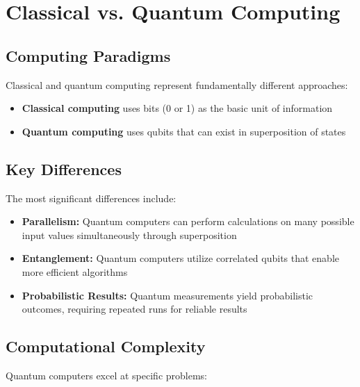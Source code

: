 \chapter{Classical vs. Quantum Computing}

\section{Computing Paradigms}
Classical and quantum computing represent fundamentally different approaches:

\begin{itemize}
    \item \textbf{Classical computing} uses bits (0 or 1) as the basic unit of information
    \item \textbf{Quantum computing} uses qubits that can exist in superposition of states
\end{itemize}

\section{Key Differences}
The most significant differences include:

\begin{itemize}
    \item \textbf{Parallelism:} Quantum computers can perform calculations on many possible input values simultaneously through superposition
    
    \item \textbf{Entanglement:} Quantum computers utilize correlated qubits that enable more efficient algorithms
    
    \item \textbf{Probabilistic Results:} Quantum measurements yield probabilistic outcomes, requiring repeated runs for reliable results
\end{itemize}


\section{Computational Complexity}
Quantum computers excel at specific problems:

